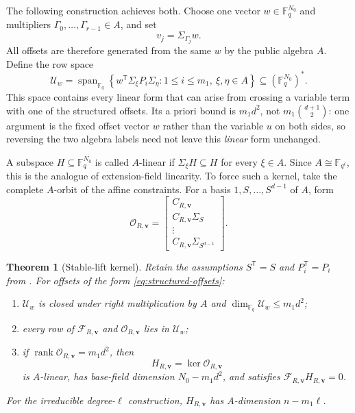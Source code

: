 \documentclass[11pt]{article}
\newtheorem{theorem}{Theorem}
\newcommand{\F}{\mathbb F}
\newcommand{\rank}{\operatorname{rank}}
\newcommand{\Span}{\operatorname{span}}
\newcommand{\transpose}{\mathsf T}
\begin{document}
The following construction achieves both.  Choose one vector
$w\in\F_q^{N_0}$ and multipliers $\Gamma_0,\ldots,\Gamma_{r-1}\in A$, and set
\begin{equation}\label{eq:structured-offsets}
 v_j=\Sigma_{\Gamma_j}w.
\end{equation}
All offsets are therefore generated from the same $w$ by the public algebra
$A$.  Define the row space
\begin{equation}\label{eq:Uw}
 \mathcal U_w=
 \Span_{\F_q}\left\{
 w^\transpose\Sigma_\xi P_i\Sigma_\eta:
 1\le i\le m_1,\ \xi,\eta\in A
 \right\}
 \subseteq(\F_q^{N_0})^*.
\end{equation}
This space contains every linear form that can arise from crossing a variable
term with one of the structured offsets.  Its a priori bound is $m_1d^2$, not
$m_1\binom{d+1}{2}$: one argument is the fixed offset vector $w$ rather than
the variable $u$ on both sides, so reversing the two algebra labels need not
leave this \emph{linear} form unchanged.

A subspace $H\subseteq\F_q^{N_0}$ is called $A$-linear if
$\Sigma_\xi H\subseteq H$ for every $\xi\in A$.  Since
$A\cong\F_{q^\ell}$, this is the analogue of extension-field linearity.  To
force such a kernel, take the complete $A$-orbit of the affine constraints.
For a basis $1,S,\ldots,S^{d-1}$ of $A$, form
\begin{equation}\label{eq:orbit-matrix}
 \mathcal O_{R,\mathbf v}=
 \begin{bmatrix}
 C_{R,\mathbf v}\\ C_{R,\mathbf v}\Sigma_S\\ \vdots\\ C_{R,\mathbf v}\Sigma_{S^{d-1}}
 \end{bmatrix}.
\end{equation}

\begin{theorem}[Stable-lift kernel]\label{thm:stable-kernel}
Retain the assumptions $S^\transpose=S$ and $P_i^\transpose=P_i$ from
.  For offsets of the form
\eqref{eq:structured-offsets}:
\begin{enumerate}[label=(\roman*)]
\item $\mathcal U_w$ is closed under right multiplication by $A$ and
$\dim_{\F_q}\mathcal U_w\le m_1d^2$;
\item every row of $\mathcal F_{R,\mathbf v}$ and $\mathcal O_{R,\mathbf v}$ lies in
$\mathcal U_w$;
\item if $\rank\mathcal O_{R,\mathbf v}=m_1d^2$, then
\[
 H_{R,\mathbf v}=\ker\mathcal O_{R,\mathbf v}
\]
is $A$-linear, has base-field dimension $N_0-m_1d^2$, and satisfies
$\mathcal F_{R,\mathbf v}H_{R,\mathbf v}=0$.
\end{enumerate}
For the irreducible degree-$\ell$ construction, $H_{R,\mathbf v}$ has $A$-dimension
$n-m_1\ell$.
\end{theorem}
\end{document}
